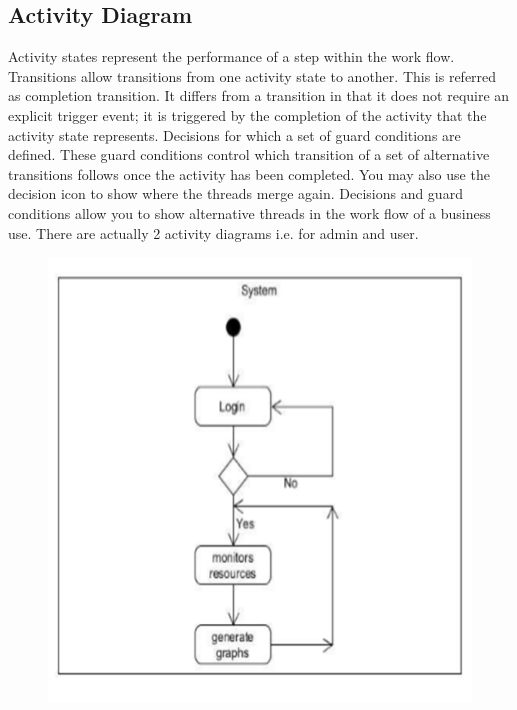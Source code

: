 \documentclass[12pt,a4paper]{report}
\begin{document}
\subsection{Activity Diagram}
Activity states represent the performance of a step within the work flow. Transitions allow transitions from one activity state to another. This is referred as completion transition. It differs from a transition in that it does not require an explicit trigger event; it is triggered by the completion of the activity that the activity state represents. Decisions for which a set of guard conditions are defined. These guard conditions control which transition of a set of alternative transitions follows once the activity has been completed. You may also use the decision icon to show where the threads merge again. Decisions and guard conditions allow you to show alternative threads in the work flow of a business use. There are actually 2 activity diagrams i.e. for admin and user.
\begin{figure}
  \includegraphics[width=\linewidth]{act.png}
\end{figure}
\end{document}
